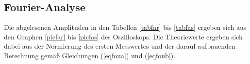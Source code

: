\subsection{Fourier-Analyse}
     
Die abgelesenen Amplituden in den Tabellen \ref{tabfar} bis \ref{tabfas} ergeben sich aus den Graphen
\ref{picfar} bis \ref{picfas} des Oszilloskops. Die Theoriewerte ergeben sich dabei aus der Normierung
des ersten Messwertes und der darauf aufbauenden Berechnung gemäß Gleichungen (\ref{eqfoua}) und (\ref{eqfoub}). 
